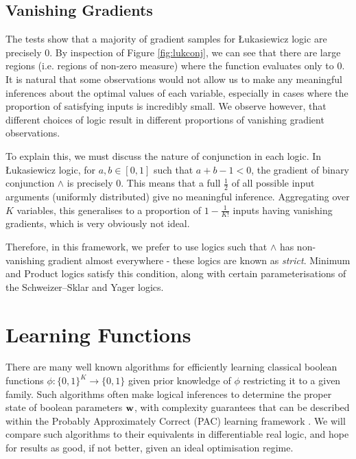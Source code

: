 \subsection{Vanishing Gradients}
\label{section:tnormzerograd}

The tests show that a majority of gradient samples for Łukasiewicz logic are precisely $0$. By inspection of Figure \ref{fig:lukconj}, we can see that there are large regions (i.e. regions of non-zero measure) where the function evaluates only to $0$. It is natural that some observations would not allow us to make any meaningful inferences about the optimal values of each variable, especially in cases where the proportion of satisfying inputs is incredibly small. We observe however, that different choices of logic result in different proportions of vanishing gradient observations.

To explain this, we must discuss the nature of conjunction in each logic. In Łukasiewicz logic, for $a, b \in [0,1]$ such that $a + b - 1 < 0$, the gradient of binary conjunction $\land$ is precisely $0$. This means that a full $\frac{1}{2}$ of all possible input arguments (uniformly distributed) give no meaningful inference. Aggregating over $K$ variables, this generalises to a proportion of $1 - \frac{1}{K!}$ inputs having vanishing gradients, which is very obviously not ideal.

Therefore, in this framework, we prefer to use logics such that $\land$ has non-vanishing gradient almost everywhere - these logics are known as \textit{strict}. Minimum and Product logics satisfy this condition, along with certain parameterisations of the Schweizer–Sklar and Yager logics.

\section{Learning Functions}

There are many well known algorithms for efficiently learning classical boolean functions $\phi : \{0,1\}^K \to \{0,1\}$ given prior knowledge of $\phi$ restricting it to a given family. Such algorithms often make logical inferences to determine the proper state of boolean parameters $\mathbf{w}$, with complexity guarantees that can be described within the Probably Approximately Correct (PAC) learning framework \cite{clt}. We will compare such algorithms to their equivalents in differentiable real logic, and hope for results as good, if not better, given an ideal optimisation regime. 

